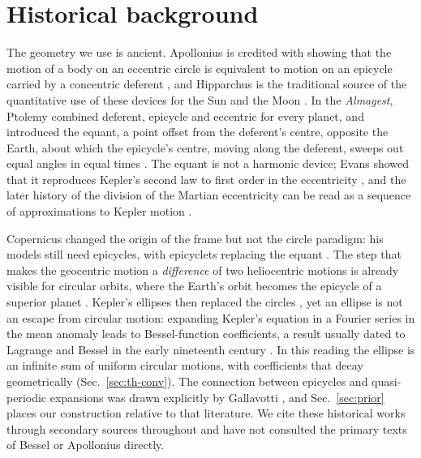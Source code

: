 \section{Historical background}
\label{sec:history}

The geometry we use is ancient. Apollonius is credited with showing that the
motion of a body on an eccentric circle is equivalent to motion on an
epicycle carried by a concentric deferent \cite{Neugebauer1975}, and
Hipparchus is the traditional source of the quantitative use of these
devices for the Sun and the Moon \cite{Neugebauer1975,Evans1998}. In the
\emph{Almagest}, Ptolemy combined deferent, epicycle and eccentric for
every planet, and introduced the equant, a point offset from the deferent's centre,
opposite the Earth, about which the epicycle's centre, moving along the
deferent, sweeps out equal angles in equal times
\cite{Toomer1998,Neugebauer1975}. The equant is not a harmonic device;
Evans showed that it reproduces Kepler's second law to first order in the
eccentricity \cite{Evans1984}, and the later history of the division of the
Martian eccentricity can be read as a sequence of approximations to Kepler
motion \cite{Evans1988}.

Copernicus changed the origin of the frame but not the circle paradigm: his
models still need epicycles, with epicyclets replacing the equant
\cite{SwerdlowNeugebauer1984}. The step that makes the geocentric motion a
\emph{difference} of two heliocentric motions is already visible for
circular orbits, where the Earth's orbit becomes the epicycle of a superior
planet \cite{Evans1998,Scholz2022}. Kepler's ellipses then replaced the
circles \cite{Boccaletti2001}, yet an ellipse is not an escape from
circular motion: expanding Kepler's equation in a Fourier series in the
mean anomaly leads to Bessel-function coefficients, a result usually dated to
Lagrange and Bessel in the early nineteenth century \cite{Dutka1995}. In
this reading the ellipse is an infinite sum of uniform circular motions,
with coefficients that decay geometrically
(Sec.~\ref{sec:th-conv}). The connection between epicycles and
quasi-periodic expansions was drawn explicitly by Gallavotti
\cite{Gallavotti2001}, and Sec.~\ref{sec:prior} places our construction
relative to that literature. We cite these historical works through
secondary sources throughout and have not consulted the primary texts of
Bessel or Apollonius directly.
